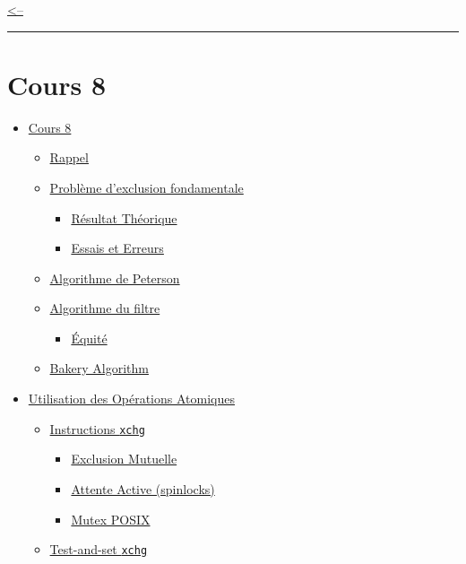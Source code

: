 \href{../README.md}{\textless--}

\begin{center}\rule{0.5\linewidth}{0.5pt}\end{center}

\section{Cours 8}\label{cours-8}

\begin{itemize}
\tightlist
\item
  \hyperref[cours-8]{Cours 8}

  \begin{itemize}
  \tightlist
  \item
    \hyperref[rappel]{Rappel}
  \item
    \hyperref[probluxe8me-dexclusion-fondamentale]{Problème d'exclusion
    fondamentale}

    \begin{itemize}
    \tightlist
    \item
      \hyperref[ruxe9sultat-thuxe9orique]{Résultat Théorique}
    \item
      \hyperref[essais-et-erreurs]{Essais et Erreurs}
    \end{itemize}
  \item
    \hyperref[algorithme-de-peterson]{Algorithme de Peterson}
  \item
    \hyperref[algorithme-du-filtre]{Algorithme du filtre}

    \begin{itemize}
    \tightlist
    \item
      \hyperref[uxe9quituxe9]{Équité}
    \end{itemize}
  \item
    \hyperref[bakery-algorithm]{Bakery Algorithm}
  \end{itemize}
\item
  \hyperref[utilisation-des-opuxe9rations-atomiques]{Utilisation des
  Opérations Atomiques}

  \begin{itemize}
  \tightlist
  \item
    \hyperref[instructions-xchg]{Instructions \texttt{xchg}}

    \begin{itemize}
    \tightlist
    \item
      \hyperref[exclusion-mutuelle]{Exclusion Mutuelle}
    \item
      \hyperref[attente-active-spinlocks]{Attente Active (spinlocks)}
    \item
      \hyperref[mutex-posix]{Mutex POSIX}
    \end{itemize}
  \item
    \hyperref[test-and-set-xchg]{Test-and-set \texttt{xchg}}


\end{itemize}
\end{itemize}
